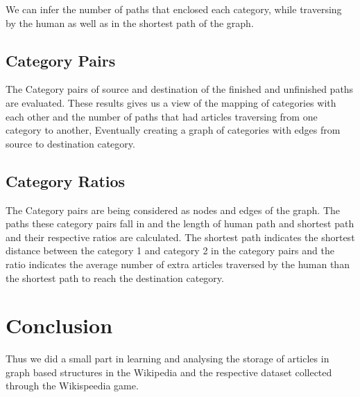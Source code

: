 \documentclass{article}
\begin{document}
\hspace{2cm}
We can infer the number of paths that enclosed each category, while traversing by the human as well as in the shortest path of the graph. \subsection{Category Pairs}
\vspace{0.5cm} 
\hspace{2cm}
The Category pairs of source and destination of the finished and unfinished paths are evaluated. These results gives us a view of the mapping of categories with each other and the number of paths that had articles traversing from one category to another, Eventually creating a graph of categories with edges from source to destination category. 
\subsection{Category Ratios}
\vspace{0.5cm} 
\hspace{2cm}
The Category pairs are being considered as nodes and edges of the graph. The paths these category pairs fall in and the length of human path and shortest path and their respective ratios are calculated. The shortest path indicates the shortest distance between the category 1 and category 2 in the category pairs and the ratio  indicates the average number of extra articles traversed by the human than the shortest path to reach the destination category.
\section{Conclusion}
\vspace{0.5cm} 
\hspace{2cm}
Thus we did a small part in learning and analysing the storage of articles in graph based structures in the Wikipedia and the respective dataset collected through the Wikispeedia game.
\end{document}
